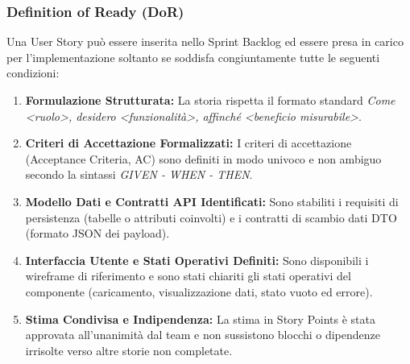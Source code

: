 \subsubsection{Definition of Ready (DoR)}
Una User Story può essere inserita nello Sprint Backlog ed essere presa in carico per l'implementazione soltanto se soddisfa congiuntamente tutte le seguenti condizioni:
\begin{enumerate}[leftmargin=1.4em, itemsep=0.2em]
    \item \textbf{Formulazione Strutturata:} La storia rispetta il formato standard \emph{Come <ruolo>, desidero <funzionalità>, affinché <beneficio misurabile>}.
    \item \textbf{Criteri di Accettazione Formalizzati:} I criteri di accettazione (Acceptance Criteria, AC) sono definiti in modo univoco e non ambiguo secondo la sintassi \emph{GIVEN - WHEN - THEN}.
    \item \textbf{Modello Dati e Contratti API Identificati:} Sono stabiliti i requisiti di persistenza (tabelle o attributi coinvolti) e i contratti di scambio dati DTO (formato JSON dei payload).
    \item \textbf{Interfaccia Utente e Stati Operativi Definiti:} Sono disponibili i wireframe di riferimento e sono stati chiariti gli stati operativi del componente (caricamento, visualizzazione dati, stato vuoto ed errore).
    \item \textbf{Stima Condivisa e Indipendenza:} La stima in Story Points è stata approvata all'unanimità dal team e non sussistono blocchi o dipendenze irrisolte verso altre storie non completate.
\end{enumerate}

